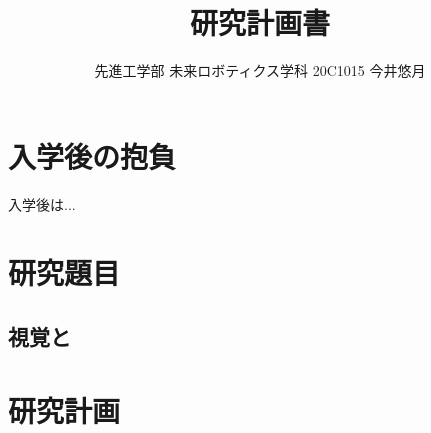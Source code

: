 \documentclass[twocolumn]{jsarticle}
\begin{document}
\title{{\vspace*{-30mm}}{\huge 研究計画書}}
\author{\large 先進工学部 未来ロボティクス学科 20C1015 今井悠月}
\date{}
\maketitle

\section{入学後の抱負}
入学後は...

\section{研究題目}
\subsection{視覚と}

\section{研究計画}
\end{document}

